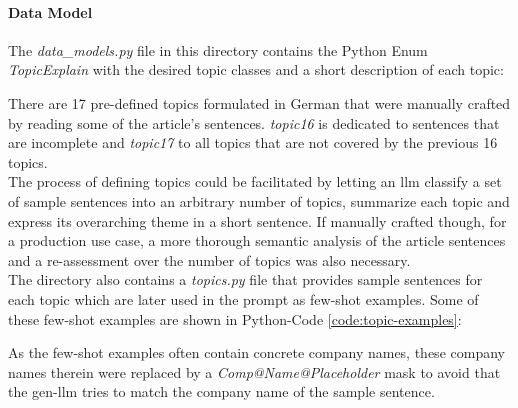 \paragraph{Data Model}
The \emph{data\_models.py} file in this directory contains the Python Enum \emph{TopicExplain} with the desired topic classes and a short description of each topic:


There are 17 pre-defined topics formulated in German that were manually crafted by reading some of the article's sentences.
\emph{topic16} is dedicated to sentences that are incomplete and \emph{topic17} to all topics that are not covered by the previous 16 topics.\\

The process of defining topics could be facilitated by letting an \gls{llm} classify a set of sample sentences into an arbitrary number of topics, summarize each topic and express its overarching theme in a short sentence.
If manually crafted though, for a production use case, a more thorough semantic analysis of the article sentences and a re-assessment over the number of topics was also necessary.\\

The directory also contains a \emph{topics.py} file that provides sample sentences for each topic which are later used in the \gls{prompt} as few-shot examples.
Some of these few-shot examples are shown in Python-Code \ref{code:topic-examples}:


As the few-shot examples often contain concrete company names, these company names therein were replaced by a \emph{Comp@Name@Placeholder} mask to avoid that the \gls{gen-llm} tries to match the company name of the sample sentence.\\


